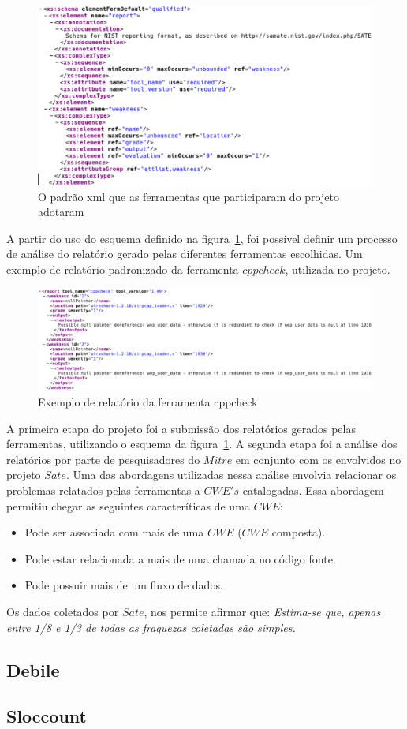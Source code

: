 \newpage
\begin{figure}[h]
	\centering
	\label{sate_schema}
        \includegraphics[scale=0.42]{figuras/sate_schema.eps}
	\caption{O padrão xml que as ferramentas que participaram do projeto adotaram}
\end{figure}

A partir do uso do esquema definido na figura~\ref{sate_schema}, foi possível definir um processo de análise do relatório
gerado pelas diferentes ferramentas escolhidas. Um exemplo de relatório padronizado da ferramenta $cppcheck$, utilizada no projeto.

\begin{figure}[h]
	\centering
	\label{cppcheck}
        \includegraphics[scale=0.42]{figuras/cppcheck.eps}
	\caption{Exemplo de relatório da ferramenta cppcheck}
\end{figure}
\newpage

A primeira etapa do projeto foi a submissão dos relatórios gerados pelas ferramentas, utilizando o esquema da figura~\ref{sate_schema}. A segunda etapa foi a análise dos relatórios por parte de pesquisadores do $Mitre$ em conjunto com os envolvidos no projeto $Sate$. Uma das abordagens utilizadas nessa análise envolvia relacionar os problemas relatados pelas ferramentas a $CWE's$ catalogadas. Essa abordagem permitiu chegar as seguintes caracteríticas de uma $CWE$:

\begin{itemize}
        \item Pode ser associada com mais de uma $CWE$ ($CWE$ composta).
        \item Pode estar relacionada a mais de uma chamada no código fonte.
        \item Pode possuir mais de um fluxo de dados.
\end{itemize}

Os dados coletados por $Sate$, nos permite afirmar que: \emph{Estima-se que, apenas entre 1/8 e 1/3  de todas as fraquezas coletadas são simples.}

\subsection{Debile}

\subsection{Sloccount}
